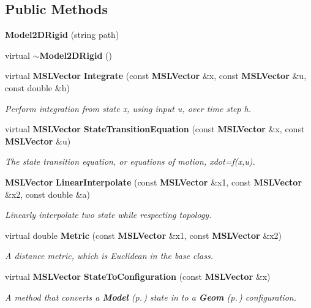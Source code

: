 \subsection*{Public Methods}
\begin{CompactItemize}
\item 
{\bf Model2DRigid} (string path)
\item 
virtual {\bf $\sim$Model2DRigid} ()
\item 
virtual {\bf MSLVector} {\bf Integrate} (const {\bf MSLVector} \&x, const {\bf MSLVector} \&u, const double \&h)
\begin{CompactList}\small\item\em Perform integration from state x, using input u, over time step h.\item\end{CompactList}\item 
virtual {\bf MSLVector} {\bf State\-Transition\-Equation} (const {\bf MSLVector} \&x, const {\bf MSLVector} \&u)
\begin{CompactList}\small\item\em The state transition equation, or equations of motion, xdot=f(x,u).\item\end{CompactList}\item 
{\bf MSLVector} {\bf Linear\-Interpolate} (const {\bf MSLVector} \&x1, const {\bf MSLVector} \&x2, const double \&a)
\begin{CompactList}\small\item\em Linearly interpolate two state while respecting topology.\item\end{CompactList}\item 
virtual double {\bf Metric} (const {\bf MSLVector} \&x1, const {\bf MSLVector} \&x2)
\begin{CompactList}\small\item\em A distance metric, which is Euclidean in the base class.\item\end{CompactList}\item 
virtual {\bf MSLVector} {\bf State\-To\-Configuration} (const {\bf MSLVector} \&x)
\begin{CompactList}\small\item\em A method that converts a {\bf Model} {\rm (p.\,\pageref{classModel})} state in to a {\bf Geom} {\rm (p.\,\pageref{classGeom})} configuration.\item\end{CompactList}\end{CompactItemize}


